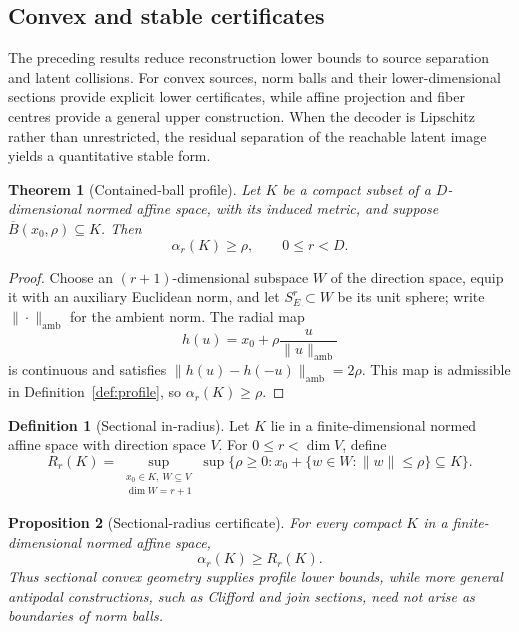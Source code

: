 \documentclass[11pt,a4paper]{article}
\theoremstyle{definition}
\newtheorem{definition}{Definition}[section]
\theoremstyle{plain}
\newtheorem{theorem}{Theorem}[section]
\newtheorem{proposition}[theorem]{Proposition}
\theoremstyle{remark}
\begin{document}
\subsection{Convex and stable certificates}

The preceding results reduce reconstruction lower bounds to source
separation and latent collisions. For convex sources, norm balls and their
lower-dimensional sections provide explicit lower certificates, while affine
projection and fiber centres provide a general upper construction. When the
decoder is Lipschitz rather than unrestricted, the residual separation
of the reachable latent image yields a quantitative stable form.

\begin{theorem}[Contained-ball profile]
\label{thm:bottleneck}
Let $K$ be a compact subset of a $D$-dimensional normed affine space,
with its induced metric, and suppose
$\overline B(x_0,\rho)\subseteq K$. Then
\[
\alpha_r(K)\geq\rho,
\qquad0\leq r<D.
\]
\end{theorem}

\begin{proof}
Choose an $(r+1)$-dimensional subspace $W$ of the direction space, equip it
with an auxiliary Euclidean norm, and let $S_E^r\subset W$ be its unit sphere; write
$\|\cdot\|_{\mathrm{amb}}$ for the ambient norm. The radial map
\[
h(u)=x_0+\rho\frac{u}{\|u\|_{\mathrm{amb}}}
\]
is continuous and satisfies
$\|h(u)-h(-u)\|_{\mathrm{amb}}=2\rho$. This map is
admissible in Definition~\ref{def:profile}, so
$\alpha_r(K)\geq\rho$.
\end{proof}

\begin{definition}[Sectional in-radius]
\label{def:sectional-radius}
Let $K$ lie in a finite-dimensional normed affine space with direction
space $V$. For $0\leq r<\dim V$, define
\[
R_r(K)=
\sup_{\substack{x_0\in K,\ W\subseteq V\\\dim W=r+1}}
\sup\{\rho\geq0:x_0+\{w\in W:\|w\|\leq\rho\}\subseteq K\}.
\]
\end{definition}

\begin{proposition}[Sectional-radius certificate]
\label{prop:sectional-radius}
For every compact $K$ in a finite-dimensional normed affine space,
\[
\alpha_r(K)\geq R_r(K).
\]
Thus sectional convex geometry supplies profile lower bounds, while more
general antipodal constructions, such as Clifford and join sections, need
not arise as boundaries of norm balls.
\end{proposition}
\end{document}
